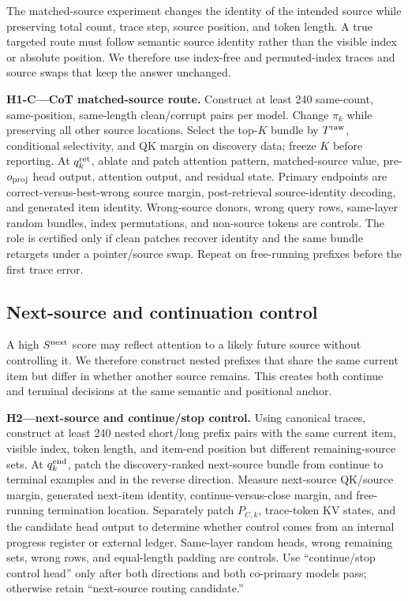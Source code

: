 The matched-source experiment changes the identity of the intended source while preserving total count, trace step, source position, and token length. A true targeted route must follow semantic source identity rather than the visible index or absolute position. We therefore use index-free and permuted-index traces and source swaps that keep the answer unchanged.

\begin{todobox}
\textbf{H1-C---CoT matched-source route.}
Construct at least 240 same-count, same-position, same-length clean/corrupt pairs per model. Change \(\pi_k\) while preserving all other source locations. Select the top-\(K\) bundle by \(T^{\rm raw}\), conditional selectivity, and QK margin on discovery data; freeze \(K\) before reporting. At \(q_k^{\rm ret}\), ablate and patch attention pattern, matched-source value, pre-\(o_{\rm proj}\) head output, attention output, and residual state. Primary endpoints are correct-versus-best-wrong source margin, post-retrieval source-identity decoding, and generated item identity. Wrong-source donors, wrong query rows, same-layer random bundles, index permutations, and non-source tokens are controls. The role is certified only if clean patches recover identity and the same bundle retargets under a pointer/source swap. Repeat on free-running prefixes before the first trace error.
\end{todobox}

\subsection{Next-source and continuation control}

A high \(S^{\rm next}\) score may reflect attention to a likely future source without controlling it. We therefore construct nested prefixes that share the same current item but differ in whether another source remains. This creates both continue and terminal decisions at the same semantic and positional anchor.

\begin{todobox}
\textbf{H2---next-source and continue/stop control.}
Using canonical traces, construct at least 240 nested short/long prefix pairs with the same current item, visible index, token length, and item-end position but different remaining-source sets. At \(q_k^{\rm end}\), patch the discovery-ranked next-source bundle from continue to terminal examples and in the reverse direction. Measure next-source QK/source margin, generated next-item identity, continue-versus-close margin, and free-running termination location. Separately patch \(P_{C,k}\), trace-token KV states, and the candidate head output to determine whether control comes from an internal progress register or external ledger. Same-layer random heads, wrong remaining sets, wrong rows, and equal-length padding are controls. Use ``continue/stop control head'' only after both directions and both co-primary models pass; otherwise retain ``next-source routing candidate.''
\end{todobox}

